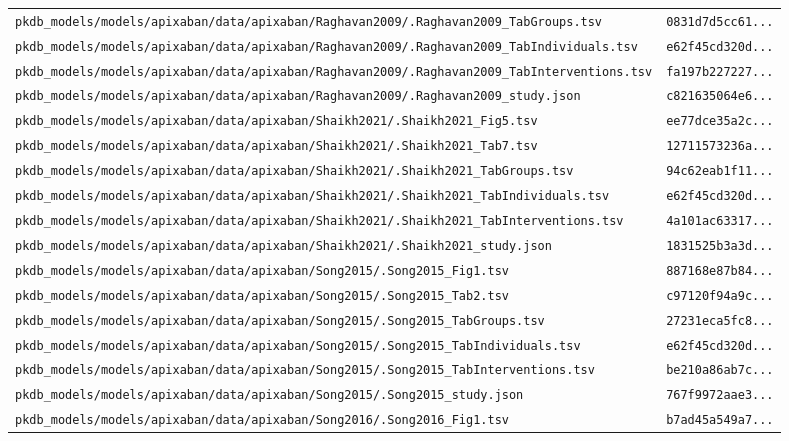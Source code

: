 \begin{longtable}{ll}
\texttt{pkdb\_models/models/apixaban/data/apixaban/Raghavan2009/.Raghavan2009\_TabGroups.tsv} & \texttt{0831d7d5cc61...} \\
\texttt{pkdb\_models/models/apixaban/data/apixaban/Raghavan2009/.Raghavan2009\_TabIndividuals.tsv} & \texttt{e62f45cd320d...} \\
\texttt{pkdb\_models/models/apixaban/data/apixaban/Raghavan2009/.Raghavan2009\_TabInterventions.tsv} & \texttt{fa197b227227...} \\
\texttt{pkdb\_models/models/apixaban/data/apixaban/Raghavan2009/.Raghavan2009\_study.json} & \texttt{c821635064e6...} \\
\texttt{pkdb\_models/models/apixaban/data/apixaban/Shaikh2021/.Shaikh2021\_Fig5.tsv} & \texttt{ee77dce35a2c...} \\
\texttt{pkdb\_models/models/apixaban/data/apixaban/Shaikh2021/.Shaikh2021\_Tab7.tsv} & \texttt{12711573236a...} \\
\texttt{pkdb\_models/models/apixaban/data/apixaban/Shaikh2021/.Shaikh2021\_TabGroups.tsv} & \texttt{94c62eab1f11...} \\
\texttt{pkdb\_models/models/apixaban/data/apixaban/Shaikh2021/.Shaikh2021\_TabIndividuals.tsv} & \texttt{e62f45cd320d...} \\
\texttt{pkdb\_models/models/apixaban/data/apixaban/Shaikh2021/.Shaikh2021\_TabInterventions.tsv} & \texttt{4a101ac63317...} \\
\texttt{pkdb\_models/models/apixaban/data/apixaban/Shaikh2021/.Shaikh2021\_study.json} & \texttt{1831525b3a3d...} \\
\texttt{pkdb\_models/models/apixaban/data/apixaban/Song2015/.Song2015\_Fig1.tsv} & \texttt{887168e87b84...} \\
\texttt{pkdb\_models/models/apixaban/data/apixaban/Song2015/.Song2015\_Tab2.tsv} & \texttt{c97120f94a9c...} \\
\texttt{pkdb\_models/models/apixaban/data/apixaban/Song2015/.Song2015\_TabGroups.tsv} & \texttt{27231eca5fc8...} \\
\texttt{pkdb\_models/models/apixaban/data/apixaban/Song2015/.Song2015\_TabIndividuals.tsv} & \texttt{e62f45cd320d...} \\
\texttt{pkdb\_models/models/apixaban/data/apixaban/Song2015/.Song2015\_TabInterventions.tsv} & \texttt{be210a86ab7c...} \\
\texttt{pkdb\_models/models/apixaban/data/apixaban/Song2015/.Song2015\_study.json} & \texttt{767f9972aae3...} \\
\texttt{pkdb\_models/models/apixaban/data/apixaban/Song2016/.Song2016\_Fig1.tsv} & \texttt{b7ad45a549a7...} \\

\end{longtable}
